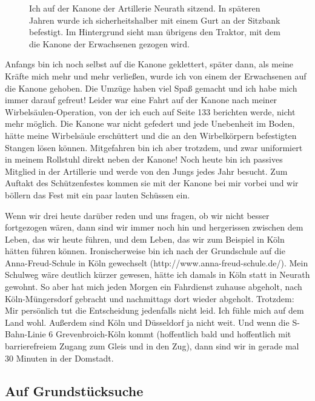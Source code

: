 \documentclass[fontsize=14pt,a4paper,headinclude,DIV=calc,automark]{scrbook}
\begin{document}
\setlength{\fboxsep}{0pt}    %
\setlength{\fboxrule}{0.2pt} %
\begin{figure}[ht]
    \centering
    \caption{Ich auf der Kanone der Artillerie Neurath sitzend. In späteren Jahren wurde ich sicherheitshalber mit einem Gurt an der Sitzbank befestigt. Im Hintergrund sieht man übrigens den Traktor, mit dem die Kanone der Erwachsenen gezogen wird.}
    \label{fig:schützenfest}
\end{figure}

Anfangs bin ich noch selbst auf die Kanone geklettert, später dann, als meine Kräfte mich mehr und mehr verließen, wurde ich von einem der Erwachsenen auf die Kanone gehoben. Die Umzüge haben viel Spaß gemacht und ich habe mich immer darauf gefreut! Leider war eine Fahrt auf der Kanone nach meiner Wirbelsäulen-Operation, von der ich euch auf Seite 133 berichten werde, nicht mehr möglich. Die Kanone war nicht gefedert und jede Unebenheit im Boden, hätte meine Wirbelsäule erschüttert und die an den Wirbelkörpern befestigten Stangen lösen können. Mitgefahren bin ich aber trotzdem, und zwar uniformiert in meinem Rollstuhl direkt neben der Kanone! Noch heute bin ich passives Mitglied in der Artillerie und werde von den Jungs jedes Jahr besucht. Zum Auftakt des Schützenfestes kommen sie mit der Kanone bei mir vorbei und wir böllern das Fest mit ein paar lauten Schüssen ein.

Wenn wir drei heute darüber reden und uns fragen, ob wir nicht besser fortgezogen wären, dann sind wir immer noch hin und hergerissen zwischen dem Leben, das wir heute führen, und dem Leben, das wir zum Beispiel in Köln hätten führen können. Ironischerweise bin ich nach der Grundschule auf die Anna-Freud-Schule in Köln gewechselt (http://www.anna-freud-schule.de/). Mein Schulweg wäre deutlich kürzer gewesen, hätte ich damals in Köln statt in Neurath gewohnt. So aber hat mich jeden Morgen ein Fahrdienst zuhause abgeholt, nach Köln-Müngersdorf gebracht und nachmittags dort wieder abgeholt. Trotzdem: Mir persönlich tut die Entscheidung jedenfalls nicht leid. Ich fühle mich auf dem Land wohl. Außerdem sind Köln und Düsseldorf ja nicht weit. Und wenn die S-Bahn-Linie 6 Grevenbroich-Köln kommt (hoffentlich bald und hoffentlich mit barrierefreiem Zugang zum Gleis und in den Zug), dann sind wir in gerade mal 30 Minuten in der Domstadt.

\subsection{Auf Grundstücksuche}
\end{document}
